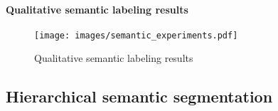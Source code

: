 \paragraph{Qualitative semantic labeling results}
\label{supsec:results:semantic-segmentation-qualitative}


\begin{figure}[!t]
\label{fig:semantic_experiments}
\centering
\texttt{[image: images/semantic\_experiments.pdf]}
\caption{Qualitative semantic labeling results}
\end{figure}

\subsection{Hierarchical semantic segmentation}
\label{supsec:results:hierarchical-segmentation}

